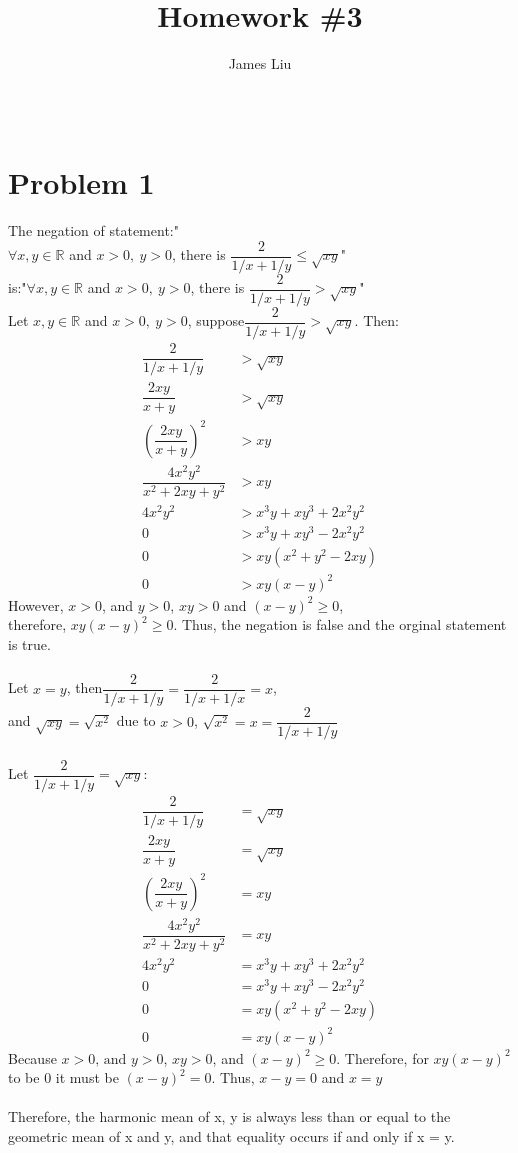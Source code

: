 \documentclass{article}
\title{\textbf{Homework \#3 }}
\author{James Liu}
\date{\ }
\begin{document}
\maketitle

\section*{Problem 1}
    The negation of statement:"\\
    \(\forall x,y\in \mathbb{R}\) and \(x>0,\ y>0\), there is \(\dfrac{2}{1/x+1/y} \leqslant \sqrt{xy}\)"\\
    is:"\(\forall x,y\in \mathbb{R}\) and \(x>0,\ y>0\), there is \(\dfrac{2}{1/x+1/y} >\sqrt{xy}\)"
    \\
    Let \(x,y\in \mathbb{R}\) and \(x>0,\ y>0\), suppose\(\dfrac {2}{1/x+1/y}> \sqrt{xy}\). Then:
    \begin{align*}
        \dfrac {2}{1/x+1/y}&> \sqrt{xy}\\
        \dfrac{2xy}{x+y}&>\sqrt{xy}\\
        \left( \dfrac{2xy}{x+y}\right)^2 &>xy\\
        \dfrac{4x^2y^2}{x^2+2xy+y^2}&>xy\\
        4x^2y^2&>x^3y+xy^3+2x^2y^2\\
        0&>x^3y+xy^3-2x^2y^2\\
        0&>xy(x^2+y^2-2xy)\\
        0&>xy(x-y)^2
    \end{align*}
    However, \(x>0\), and \(y>0\), \(xy>0\) and \((x-y)^2\geqslant 0\),\\
    therefore, \(xy(x-y)^2\geqslant 0\). Thus, the negation is false and the orginal statement is true.
    \\
    \\
    Let \(x=y\), then\(\dfrac{2}{1/x+1/y} = \dfrac{2}{1/x+1/x}=x\),\\
    and \(\sqrt{xy}=\sqrt{x^2}\) due to \(x>0\), \(\sqrt{x^2}=x=\dfrac{2}{1/x+1/y}\)
    \\
    \\
    Let \(\dfrac{2}{1/x+1/y} = \sqrt{xy}\):
    \begin{align*}
        \dfrac {2}{1/x+1/y}&= \sqrt{xy}\\
        \dfrac{2xy}{x+y}&=\sqrt{xy}\\
        \left( \dfrac{2xy}{x+y}\right)^2 &=xy\\
        \dfrac{4x^2y^2}{x^2+2xy+y^2}&=xy\\
        4x^2y^2&=x^3y+xy^3+2x^2y^2\\
        0&=x^3y+xy^3-2x^2y^2\\
        0&=xy(x^2+y^2-2xy)\\
        0&=xy(x-y)^2
    \end{align*}
    Because \(x>0\text{, and }y>0\), \(xy>0\), and \((x-y)^2\geqslant 0\). Therefore, for \(xy(x-y)^2\) to be \(0\)
    it must be \((x-y)^2=0\). Thus, \(x-y=0\) and \(x=y\)\\
    \\
    Therefore, the harmonic mean of x, y is always less than or equal to the geometric
    mean of x and y, and that equality occurs if and only if x = y.
\newpage
\end{document}
